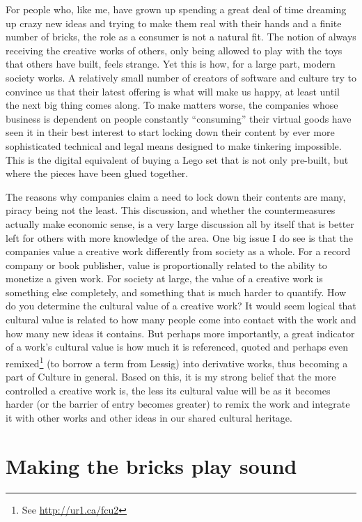 For people who, like me, have grown up spending a great deal of time dreaming up
crazy new ideas and trying to make them real with their hands and a
f\hbox{}inite number of bricks, the role as a consumer is not a natural
f\hbox{}it. The notion of always receiving the creative works of others, only
being allowed to play with the toys that others have built, feels strange. Yet
this is how, for a large part, modern society works. A relatively small number
of creators of software and culture try to convince us that their latest
of\hbox{}fering is what will make us happy, at least until the next big thing
comes along. To make matters worse, the companies whose business is dependent on
people constantly ``consuming'' their virtual goods have seen it in their best
interest to start locking down their content by ever more sophisticated
technical and legal means designed to make tinkering impossible. This is the
digital equivalent of buying a Lego set that is not only pre-built, but where
the pieces have been glued together.

The reasons why companies claim a need to lock down their contents are many,
piracy being not the least. This discussion, and whether the countermeasures
actually make economic sense, is a very large discussion all by itself that is
better left for others with more knowledge of the area. One big issue I do see
is that the companies value a creative work dif\hbox{}ferently from society as a
whole.  For a record company or book publisher, value is proportionally related
to the ability to monetize a given work. For society at large, the value of a
creative work is something else completely, and something that is much harder to
quantify. How do you determine the cultural value of a creative work? It would
seem logical that cultural value is related to how many people come into contact
with the work and how many new ideas it contains. But perhaps more importantly,
a great indicator of a work's cultural value is how much it is referenced,
quoted and perhaps even remixed\footnote{See \url{http://ur1.ca/fcu2}} (to
borrow a term from Lessig) into derivative works, thus becoming a part of
Culture in general. Based on this, it is my strong belief that the more
controlled a creative work is, the less its cultural value will be as it becomes
harder (or the barrier of entry becomes greater) to remix the work and integrate
it with other works and other ideas in our shared cultural heritage.


\section{Making the bricks play sound}
\label{s:consumer_to_creator:play_sound}

